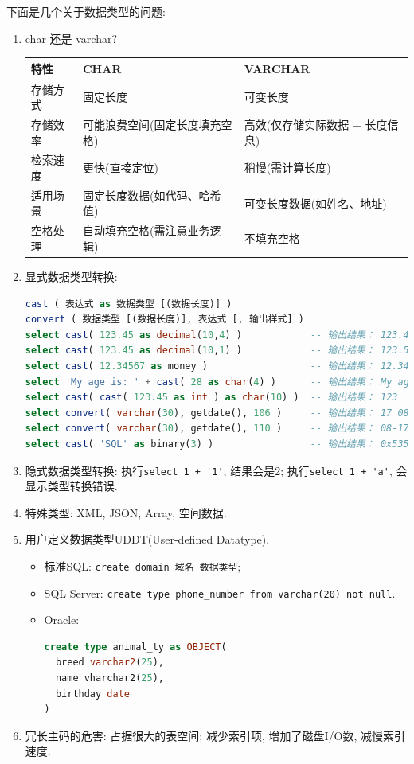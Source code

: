 下面是几个关于数据类型的问题:
\begin{enumerate}
    \item char 还是 varchar?
    \begin{table}[H]
      \centering
      \begin{tabular}{|l|l|l|}
        \hline
        \textbf{特性} & \textbf{CHAR} & \textbf{VARCHAR} \\ \hline
        存储方式 &	固定长度 & 可变长度 \\ \hline
        存储效率 & 可能浪费空间(固定长度填充空格) &	高效(仅存储实际数据 + 长度信息)\\ \hline
        检索速度 & 更快(直接定位)& 稍慢(需计算长度) \\ \hline
        适用场景 & 固定长度数据(如代码、哈希值) &	可变长度数据(如姓名、地址) \\ \hline
        空格处理 & 自动填充空格(需注意业务逻辑) &	不填充空格 \\ \hline
      \end{tabular}
    \end{table}
    \item 显式数据类型转换: 
    \begin{lstlisting}[language=SQL]
cast ( 表达式 as 数据类型 [(数据长度)] )
convert ( 数据类型 [(数据长度)], 表达式 [, 输出样式] )
select cast( 123.45 as decimal(10,4) )            -- 输出结果： 123.4500
select cast( 123.45 as decimal(10,1) )            -- 输出结果： 123.5
select cast( 12.34567 as money )                  -- 输出结果： 12.3457
select 'My age is: ' + cast( 28 as char(4) )      -- 输出结果： My age is: 28
select cast( cast( 123.45 as int ) as char(10) )  -- 输出结果： 123
select convert( varchar(30), getdate(), 106 )     -- 输出结果： 17 08 2012
select convert( varchar(30), getdate(), 110 )     -- 输出结果： 08-17-2012
select cast( 'SQL' as binary(3) )                 -- 输出结果： 0x53514C
    \end{lstlisting}
    \item 隐式数据类型转换: 执行\verb|select 1 + '1'|, 结果会是2; 执行\verb|select 1 + 'a'|, 会显示类型转换错误.
    \item 特殊类型: XML, JSON, Array, 空间数据.
    \item 用户定义数据类型UDDT(User-defined Datatype).
    \begin{itemize}
      \item 标准SQL: \verb|create domain 域名 数据类型|;
      \item SQL Server: \verb|create type phone_number from varchar(20) not null|.
      \item Oracle: 
      \begin{lstlisting}[language=SQL]
create type animal_ty as OBJECT(
  breed varchar2(25),
  name vharchar2(25),
  birthday date
)
      \end{lstlisting}
    \end{itemize}
    \item 冗长主码的危害: 占据很大的表空间; 减少索引项, 增加了磁盘I/O数, 减慢索引速度.
\end{enumerate}

